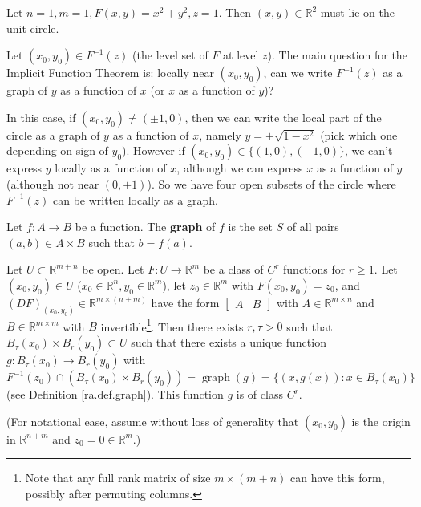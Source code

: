 \begin{example}

Let \(n=1, m=1, F(x,y) = x^2 + y^2, z = 1\). Then \((x,y) \in \mathbb{R}^2\) must lie on the unit circle.

Let \((x_0, y_0) \in F^{-1}(z)\) (the level set of \(F\) at level \(z\)). The main question for the Implicit Function Theorem is: locally near \((x_0, y_0)\), can we write \(F^{-1}(z)\) as a graph of \(y\) as a function of \(x\) (or \(x\) as a function of \(y\))?

In this case, if \((x_0, y_0) \neq (\pm 1, 0)\), then we can write the local part of the circle as a graph of \(y\) as a function of \(x\), namely \(y = \pm \sqrt{1-x^2}\) (pick which one depending on sign of \(y_0\)). However if \((x_0, y_0) \in \{(1,0), (-1,0)\}\), we can't express \(y\) locally as a function of \(x\), although we can express \(x\) as a function of \(y\) (although not near \((0, \pm1)\)). So we have four open subsets of the circle where \(F^{-1}(z)\) can be written locally as a graph.

\end{example}

\begin{definition}\label{ra.def.graph}

Let \(f: A \to B\) be a function. The \textbf{graph} of \(f\) is the set \(S\) of all pairs \((a,b) \in A \times B\) such that \(b = f(a)\).

\end{definition}

\begin{theorem}\label{ra.imp.fxn.thm}

Let \(U \subset \mathbb{R}^{m+n}\) be open. Let \(F: U \to \mathbb{R}^m\) be a class of \(C^r\) functions for \(r \geq 1\). Let \((x_0, y_0) \in U\) (\(x_0 \in \mathbb{R}^n, y_0 \in \mathbb{R}^m\)), let \(z_0 \in \mathbb{R}^m\) with \(F(x_0, y_0) = z_0\), and \((DF)_{(x_0, y_0)} \in \mathbb{R}^{m \times (n +m)}\) have the form \(\begin{bmatrix} A & B \end{bmatrix}\) with \(A \in \mathbb{R}^{m \times n}\) and \(B \in \mathbb{R}^{m \times m}\) with \(B\) invertible\footnote{Note that any full rank matrix of size \(m \times (m + n)\) can have this form, possibly after permuting columns.}. Then there exists \(r, \tau > 0\) such that \(B_\tau(x_0) \times B_r(y_0) \subset U\) such that there exists a unique function \(g: B_\tau(x_0) \to B_r(y_0)\) with \(F^{-1}(z_0) \cap ( B_\tau(x_0) \times B_r(y_0)) = \operatorname{graph}(g) = \{(x, g(x)): x \in B_\tau(x_0)\}\) (see Definition \ref{ra.def.graph}). This function \(g\) is of class \(C^r\). 

(For notational ease, assume without loss of generality that \((x_0, y_0)\) is the origin in \(\mathbb{R}^{n + m}\) and \(z_0 = 0 \in \mathbb{R}^m\).)

\end{theorem}

